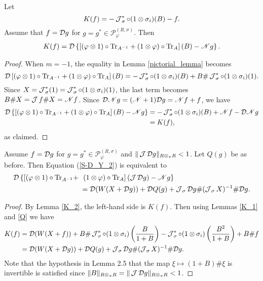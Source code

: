 \begin{lem}\label{K_2}
Let
	\begin{equation*}
		K(f)=-\operatorname{\mathcal J}_\sigma^*\circ(1\otimes\sigma_i)(B)-f.
	\end{equation*}
Assume that $f=\mathcal D g$ for $g=g^*\in \mathscr{P}_\varphi^{(R,\sigma)}$. Then
	\begin{align*}
		K(f)=\mathcal D\left\{ \left[ (\varphi\otimes 1)\circ\text{Tr}_{A^{-1}} + (1\otimes\varphi)\circ \text{Tr}_A\right](B) - \mathscr{N} g\right\}.
	\end{align*}
\end{lem}
\begin{proof}
When $m=-1$, the equality in Lemma \ref{pictorial_lemma} becomes
	\begin{equation*}
		\mathcal D\left[ (\varphi\otimes 1)\circ\text{Tr}_{A^{-1}} + (1\otimes\varphi)\circ \text{Tr}_A\right](B) = -\operatorname{\mathcal J}_\sigma^*\circ(1\otimes\sigma_i)(B)+B\#\operatorname{\mathcal J}_\sigma^*\circ(1\otimes \sigma_i)(1).
	\end{equation*}
Since $X=\operatorname{\mathcal J}_\sigma^*(1)=\operatorname{\mathcal J}_\sigma^*\circ(1\otimes \sigma_i)(1)$, the last term becomes $B\# X= \operatorname{\mathcal J} f\# X=\mathscr{N} f$. Since $\mathcal D\mathscr{N} g=(\mathscr{N}+1)\mathcal D g=\mathscr{N} f+  f$, we have
	\begin{align*}
		\mathcal D\left\{ \left[ (\varphi\otimes 1)\circ\text{Tr}_{A^{-1}} + (1\otimes\varphi)\circ \text{Tr}_A\right](B) - \mathscr{N} g\right\}&=-\operatorname{\mathcal J}_\sigma^*\circ(1\otimes\sigma_i)(B) +\mathscr{N} f- \mathcal D\mathscr{N} g\\
			&=K(f),
	\end{align*}
as claimed.
\end{proof}

\begin{lem}\label{S-D_Y_2=3}
Assume $f=\mathcal D g$ for $g=g^*\in \mathscr{P}_\varphi^{(R,\sigma)}$ and $\|\operatorname{\mathcal J}\mathcal D g\|_{R\otimes_\pi R}<1$. Let $Q(g)$ be as before. Then Equation (\ref{S-D_Y_2}) is equivalent to
	\begin{align}\label{S-D_Y_3}
		\mathcal D\left\{ \left[ (\varphi\otimes 1)\circ\text{Tr}_{A^{-1}} +\right.\right.&\left.\left. (1\otimes\varphi)\circ \text{Tr}_A\right](\operatorname{\mathcal J}\mathcal D g) - \mathscr{N} g\right\} \notag\\
											&= \mathcal D(W(X+\mathcal D g))+\mathcal D Q(g)+ \operatorname{\mathcal J}_\sigma\mathcal D g\#(\operatorname{\mathcal J}_\sigma X)^{-1}\#\mathcal D g.
	\end{align}
\end{lem}
\begin{proof}
By Lemma \ref{K_2}, the left-hand side is $K(f)$. Then using Lemmas \ref{K_1} and \ref{Q} we have
	\begin{align*}
		K(f)&=\mathcal D(W(X+f)) + B\#\operatorname{\mathcal J}_\sigma^*\circ(1\otimes\sigma_i)\left(\frac{B}{1+B}\right)-\operatorname{\mathcal J}_\sigma^*\circ(1\otimes\sigma_i)\left(\frac{B^2}{1+B}\right) + B\# f\\
		&=\mathcal D(W(X+\mathcal D g))+ \mathcal D Q(g) + \operatorname{\mathcal J}_\sigma\mathcal D g\#(\operatorname{\mathcal J}_\sigma X)^{-1}\# \mathcal D g.
	\end{align*}
Note that the hypothesis in Lemma 2.5 that the map $\xi\mapsto (1+B)\#\xi$ is invertible is satisfied since $\|B\|_{R\otimes_\pi R}=\|\operatorname{\mathcal J}\mathcal D g\|_{R\otimes_\pi R}<1$.
\end{proof}


